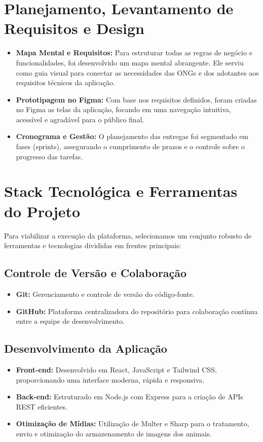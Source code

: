 \documentclass[12pt,a4paper]{article}
\begin{document}
\section{Planejamento, Levantamento de Requisitos e Design}
\begin{itemize}[leftmargin=*]
    \item \textbf{Mapa Mental e Requisitos:} Para estruturar todas as regras de negócio e funcionalidades, foi desenvolvido um mapa mental abrangente. Ele serviu como guia visual para conectar as necessidades das ONGs e dos adotantes aos requisitos técnicos da aplicação.
    \item \textbf{Prototipagem no Figma:} Com base nos requisitos definidos, foram criadas no Figma as telas da aplicação, focando em uma navegação intuitiva, acessível e agradável para o público final.
    \item \textbf{Cronograma e Gestão:} O planejamento das entregas foi segmentado em fases (sprints), assegurando o cumprimento de prazos e o controle sobre o progresso das tarefas.
\end{itemize}

\section{Stack Tecnológica e Ferramentas do Projeto}
Para viabilizar a execução da plataforma, selecionamos um conjunto robusto de ferramentas e tecnologias divididas em frentes principais:

\subsection*{Controle de Versão e Colaboração}
\begin{itemize}[leftmargin=*]
    \item \textbf{Git:} Gerenciamento e controle de versão do código-fonte.
    \item \textbf{GitHub:} Plataforma centralizadora do repositório para colaboração contínua entre a equipe de desenvolvimento.
\end{itemize}

\subsection*{Desenvolvimento da Aplicação}
\begin{itemize}[leftmargin=*]
    \item \textbf{Front-end:} Desenvolvido em React, JavaScript e Tailwind CSS, proporcionando uma interface moderna, rápida e responsiva.
    \item \textbf{Back-end:} Estruturado em Node.js com Express para a criação de APIs REST eficientes.
    \item \textbf{Otimização de Mídias:} Utilização de Multer e Sharp para o tratamento, envio e otimização do armazenamento de imagens dos animais.
\end{itemize}
\end{document}
